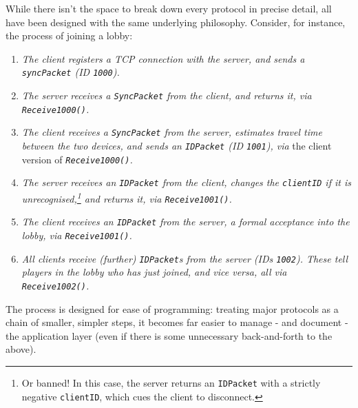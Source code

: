 \documentclass[a4paper, 9pt]{article}
\begin{document}
\begin{flushleft}
\vspace{5pt}\noindent
While there isn't the space to break down every protocol in precise detail, all have been designed with the same underlying philosophy. Consider, for instance, the process of joining a lobby:
\begin{enumerate}[label=\textit{\arabic*}\textit{.}, noitemsep]
\item \textit{The client registers a TCP connection with the server, and sends a \texttt{syncPacket} (ID \texttt{1000}).} %
\item \textit{The server receives a \texttt{SyncPacket} from the client, and returns it, via \texttt{Receive1000()}.} %
\item \textit{The client receives a \texttt{SyncPacket} from the server, estimates travel time between the two devices, and sends an \texttt{IDPacket} (ID \texttt{1001}), via} the client version of \textit{\texttt{Receive1000()}.} %
\item \textit{The server receives an \texttt{IDPacket} from the client, changes the \texttt{clientID} if it is unrecognised,\footnote{Or banned! In this case, the server returns an \texttt{IDPacket} with a strictly negative \texttt{clientID}, which cues the client to disconnect.} and returns it, via \texttt{Receive1001()}.} %
\item \textit{The client receives an \texttt{IDPacket} from the server, a formal acceptance into the lobby, via \texttt{Receive1001()}.} %
\item \textit{All clients receive (further) \texttt{IDPacket}s from the server (IDs \texttt{1002}). These tell players in the lobby who has just joined, and vice versa, all via \texttt{Receive1002()}.}
\end{enumerate}
The process is designed for ease of programming: treating major protocols as a chain of smaller, simpler steps, it becomes far easier to manage - and document - the application layer (even if there is some unnecessary back-and-forth to the above).



\end{flushleft}
\end{document}
